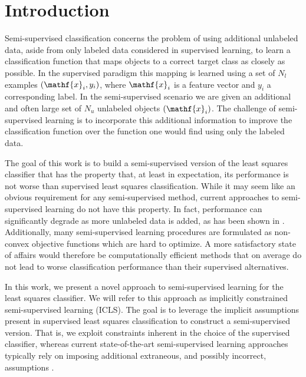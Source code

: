 \documentclass{elsarticle}
\begin{document}
\section{Introduction}
\label{section:Introduction}
Semi-supervised classification concerns the problem of using additional unlabeled data, aside from only labeled data considered in supervised learning, to learn a classification function that maps objects to a correct target class as closely as possible.
In the supervised paradigm this mapping is learned using a set of $N_l$ examples $(\mathf{x}_i,y_i)$, where $\mathf{x}_i$ is a feature vector and $y_i$ a corresponding label.  In the semi-supervised scenario we are given an additional and often large set of $N_u$ unlabeled objects $(\mathf{x}_i)$. 
The challenge of semi-supervised learning is to incorporate this additional information to improve the classification function over the function one would find using only the labeled data.

The goal of this work is to build a semi-supervised version of the least squares classifier that has the property that, at least in expectation, its performance is not worse than supervised least squares classification.
While it may seem like an obvious requirement for any semi-supervised method, current approaches to semi-supervised learning do not have this property. 
In fact, performance can significantly degrade as more unlabeled data is added, as has been shown in \cite{Cozman2006}. 
Additionally, many semi-supervised learning procedures are formulated as non-convex objective functions which are hard to optimize. 
A more satisfactory state of affairs would therefore be computationally efficient methods that on average do not lead to worse classification performance than their supervised alternatives.

In this work, we present a novel approach to semi-supervised learning for the least squares classifier. 
We will refer to this approach as implicitly constrained semi-supervised learning (ICLS). 
The goal is to leverage the implicit assumptions present in supervised least squares classification to construct a semi-supervised version. 
That is, we exploit constraints inherent in the choice of the supervised classifier, whereas current state-of-the-art semi-supervised learning approaches typically rely on imposing additional extraneous, and possibly incorrect, assumptions \cite{Seeger2001,Singh2008}.
\end{document}
